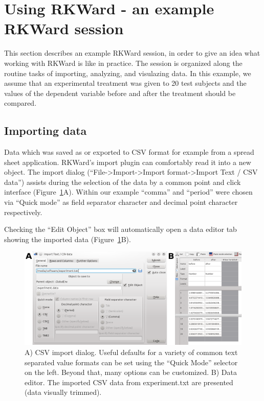 \section{Using RKWard - an example RKWard session}
\label{sec:using_RKWard}
This section describes an example RKWard session, in order to give an idea
what working with RKWard is like in practice.
The session is organized along the routine tasks of importing,
analyzing, and visulazing data. In this example, we assume that an experimental
treatment was given to 20 test subjects and the values of the dependent
variable before and after the treatment should be compared. 

\subsection{Importing data}
\label{sec:importing_data}
Data which was saved as or exported to CSV format for example from a
spread sheet application. RKWard's import plugin can
comfortably read it into a new  object.
The import dialog (``File->Import->Import
format->Import Text / CSV data'') assists during the
selection of the data by a common point and click interface (Figure~\ref{fig:import_data}A). Within our
example ``comma'' and ``period'' were chosen via ``Quick mode'' as field
separator character and decimal point character respectively.


Checking the ``Edit Object'' box will automatically open a data editor tab
showing the imported data (Figure~\ref{fig:import_data}B).

\begin{figure}[htp]
 \centering
 \includegraphics[width=15.5cm]{../figures/import_data.png}
 \caption{A) CSV import dialog. Useful defaults for a variety of common text separated value formats can
  be set using the ``Quick Mode'' selector on the left. Beyond that, many options can be customized. B) Data editor. The imported CSV
  data from experiment.txt are presented (data visually trimmed).}
 \label{fig:import_data}
\end{figure}

